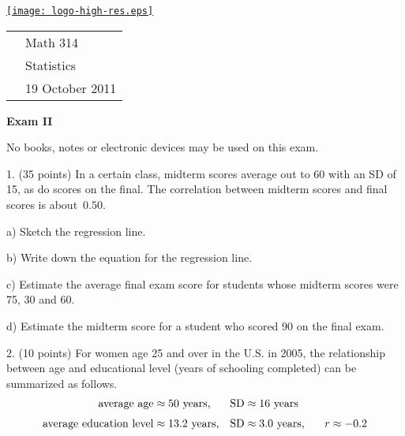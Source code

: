 \documentclass[10pt]{article}
\begin{document}
\pagestyle{empty}
\lstset{language=R, showspaces=false, showstringspaces=false}

\href{http://www.shepherd.edu}{\texttt{[image: logo-high-res.eps]}}
\vspace{-1.69cm}

{\small
\begin{tabular}{cl}
& Math 314\\
& Statistics\\
\hspace{5.28in} & 19 October 2011
\end{tabular}
}
\setlength{\baselineskip}{1.05\baselineskip}

\begin{center}
\textbf{\large  Exam II}
\end{center}
No books, notes or electronic devices may be used on this exam.
\medskip

1. (35 points) In a certain class, midterm scores average out to 60 with an SD of 15, as do 
scores on the final.  The correlation between midterm scores and final scores is 
about~$0.50$.   

\hspace{20pt} a) Sketch the regression line. %
\vspace{1.25in}

\hspace{20pt} b) Write down the equation for the regression line. %
\vspace{1in}

\hspace{20pt} c) 
Estimate the average final exam score for students whose midterm scores were
75, 30 and 60. %
\vspace{2.75in}

\hspace{20pt} d) Estimate the midterm score for a student who scored 90 on the final exam.
\vfill
\eject
{\ }


2. (10 points) For women age 25 and over in the U.S. in 2005, the relationship between
age and educational level (years of schooling completed) can be summarized as
follows. 
\begin{align*}
\mbox{average age}         & \approx \mbox{50 years,}    & \mbox{SD} & \approx \mbox{16 years}\\[3pt]
\mbox{average education level}  & \approx \mbox{13.2 years,}  & \mbox{SD} & \approx \mbox{3.0 years,
   \hspace{15pt}} r\approx -0.2
\end{align*}
\end{document}
